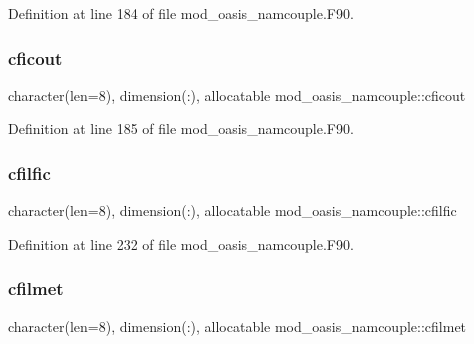 Definition at line 184 of file mod\+\_\+oasis\+\_\+namcouple.\+F90.

\mbox{\label{namespacemod__oasis__namcouple_a62f96a372f013fc37713f8ba1728e3de}} 
\subsubsection{\texorpdfstring{cficout}{cficout}}
{\footnotesize\ttfamily character(len=8), dimension(\+:), allocatable mod\+\_\+oasis\+\_\+namcouple\+::cficout\hspace{0.3cm}{\ttfamily [private]}}



Definition at line 185 of file mod\+\_\+oasis\+\_\+namcouple.\+F90.

\mbox{\label{namespacemod__oasis__namcouple_a6a69d927924d3fa391fdc3ec6cb78197}} 
\subsubsection{\texorpdfstring{cfilfic}{cfilfic}}
{\footnotesize\ttfamily character(len=8), dimension(\+:), allocatable mod\+\_\+oasis\+\_\+namcouple\+::cfilfic\hspace{0.3cm}{\ttfamily [private]}}



Definition at line 232 of file mod\+\_\+oasis\+\_\+namcouple.\+F90.

\mbox{\label{namespacemod__oasis__namcouple_adf402f22f61893178fadcefe43b91102}} 
\subsubsection{\texorpdfstring{cfilmet}{cfilmet}}
{\footnotesize\ttfamily character(len=8), dimension(\+:), allocatable mod\+\_\+oasis\+\_\+namcouple\+::cfilmet\hspace{0.3cm}{\ttfamily [private]}}



